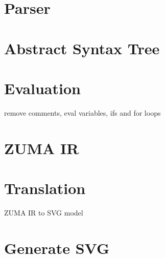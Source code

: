 \documentclass{scrreprt}
\begin{document}
\section{Parser}

\section{Abstract Syntax Tree}

\section{Evaluation}

remove comments, eval variables, ifs and for loops

\section{ZUMA IR}

\section{Translation}

ZUMA IR to SVG model

\section{Generate SVG}
\end{document}
